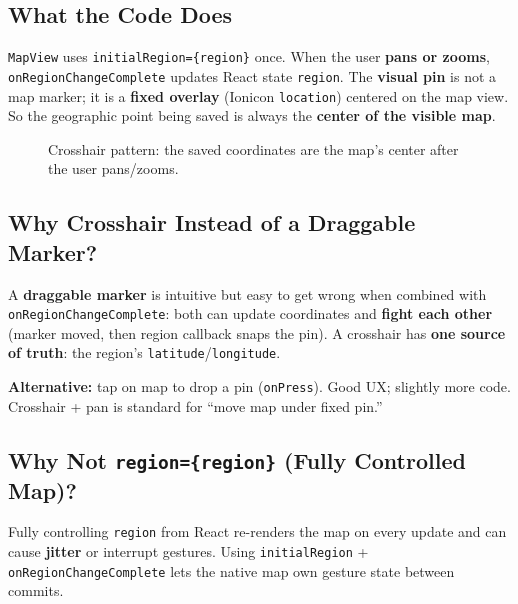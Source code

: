 \documentclass[11pt,a4paper]{article}
\begin{document}
\subsection{What the Code Does}

\texttt{MapView} uses \texttt{initialRegion=\{region\}} once. When the user \textbf{pans or zooms}, \texttt{onRegionChangeComplete} updates React state \texttt{region}. The \textbf{visual pin} is not a map marker; it is a \textbf{fixed overlay} (Ionicon \texttt{location}) centered on the map view. So the geographic point being saved is always the \textbf{center of the visible map}.

\begin{figure}[h]
\centering
{}
\caption{Crosshair pattern: the saved coordinates are the map's center after the user pans/zooms.}
\end{figure}

\subsection{Why Crosshair Instead of a Draggable Marker?}

A \textbf{draggable marker} is intuitive but easy to get wrong when combined with \texttt{onRegionChangeComplete}: both can update coordinates and \textbf{fight each other} (marker moved, then region callback snaps the pin). A crosshair has \textbf{one source of truth}: the region's \texttt{latitude}/\texttt{longitude}.

\textbf{Alternative:} tap on map to drop a pin (\texttt{onPress}). Good UX; slightly more code. Crosshair + pan is standard for ``move map under fixed pin.''

\subsection{Why Not \texttt{region=\{region\}} (Fully Controlled Map)?}

Fully controlling \texttt{region} from React re-renders the map on every update and can cause \textbf{jitter} or interrupt gestures. Using \texttt{initialRegion} + \texttt{onRegionChangeComplete} lets the native map own gesture state between commits.
\end{document}
